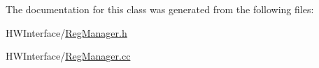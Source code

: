 The documentation for this class was generated from the following files\-:\begin{DoxyCompactItemize}
\item 
H\-W\-Interface/\hyperlink{_reg_manager_8h}{Reg\-Manager.\-h}\item 
H\-W\-Interface/\hyperlink{_reg_manager_8cc}{Reg\-Manager.\-cc}\end{DoxyCompactItemize}
